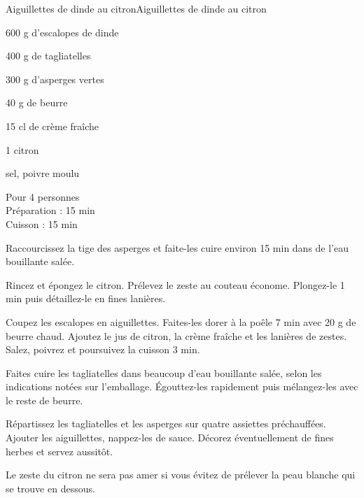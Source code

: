 \begin{recette}{Aiguillettes de dinde au citron}{Aiguillettes de dinde au citron}

\begin{ingredients}
600 g d’escalopes de dinde \par
400 g de tagliatelles\par
300 g d’asperges vertes \par
40 g de beurre\par
15 cl de crème fraîche\par
1 citron\par
sel, poivre moulu\par
\end{ingredients}

\begin{infos}
Pour 4 personnes\\
Préparation : 15 min\\
Cuisson : 15 min\\
\end{infos}

\begin{etapes}
\item Raccourcissez la tige des asperges et faite-les cuire environ 15 min dans de l’eau bouillante salée.
\item Rincez et épongez le citron. Prélevez le zeste au couteau économe. Plongez-le 1 min puis détaillez-le en fines lanières.
\item Coupez les escalopes en aiguillettes. Faites-les dorer à la poêle 7 min avec 20 g de beurre chaud. Ajoutez le jus de citron, la crème fraîche et les lanières de zestes. Salez, poivrez et poursuivez la cuisson 3 min.
\item Faites cuire les tagliatelles dans beaucoup d’eau bouillante salée, selon les indications notées sur l’emballage. Égouttez-les rapidement puis mélangez-les avec le reste de beurre.
\item Répartissez les tagliatelles et les asperges sur quatre assiettes préchauffées. Ajouter les aiguillettes, nappez-les de sauce. Décorez éventuellement de fines herbes et servez aussitôt.
\end{etapes}

\begin{conseils}
Le zeste du citron ne sera pas amer si vous évitez de prélever la peau blanche qui se trouve en dessous.
\end{conseils}

\end{recette}
